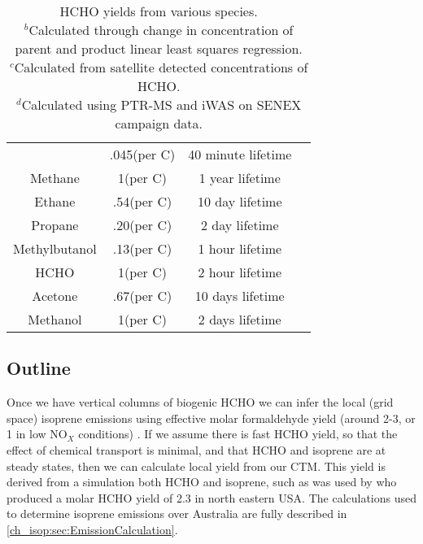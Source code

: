 \begin{table}
\begin{tabular}{ | c | c | c | c |  }
                            & .045(per C)      & 40 minute lifetime & \citep{Palmer2003}               \\
       Methane          & 1(per C)      & 1 year lifetime   & \citep{Palmer2003}     \\ 
       Ethane            & .54(per C)   & 10 day lifetime   & \citep{Palmer2003}     \\ 
       Propane           & .20(per C)   & 2 day lifetime    & \citep{Palmer2003}     \\ 
       Methylbutanol    & .13(per C)    & 1 hour lifetime  &  \citep{Palmer2003}     \\ 
       HCHO             & 1(per C)      & 2 hour lifetime   &   \citep{Palmer2003}     \\ 
       Acetone          & .67(per C)    & 10 days lifetime  &  \citep{Palmer2003}     \\ 
       Methanol         & 1(per C)      & 2 days lifetime   &  \citep{Palmer2003}     \\ 
       \hline             
    \end{tabular}
    \caption{%
      HCHO yields from various species. \hspace{\textwidth} \\ 
      ${}^b$Calculated through change in concentration of parent and product linear least squares regression. \hspace{\textwidth} \\
      ${}^c$Calculated from satellite detected concentrations of HCHO. \hspace{\textwidth} \\
      ${}^d$Calculated using PTR-MS and iWAS on SENEX campaign data.
    }
    \label{ch_isop:tab:VOCLiteratureYields}
    \end{table}

  \subsection{Outline}
    Once we have vertical columns of biogenic HCHO we can infer the local (grid space) isoprene emissions using effective molar formaldehyde yield (around 2-3, or 1 in low NO$_X$ conditions) \citep{Palmer2003,Marais2013,Bauwens2016}.
    If we assume there is fast HCHO yield, so that the effect of chemical transport is minimal, and that HCHO and isoprene are at steady states, then we can calculate local yield from our CTM.
    This yield is derived from a simulation both HCHO and isoprene, such as was used by \citet{Millet2006} who produced a molar HCHO yield of 2.3 in north eastern USA.
    The calculations used to determine isoprene emissions over Australia are fully described in \ref{ch_isop:sec:EmissionCalculation}.
    
